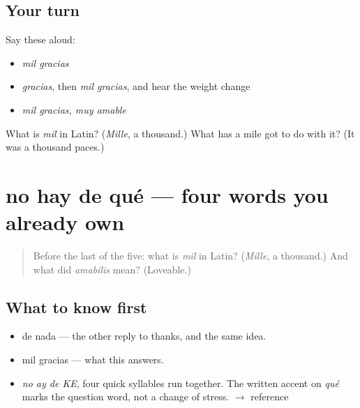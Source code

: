 \subsection*{Your turn}
Say these aloud:

\begin{itemize}
\raggedright
  \item \emph{mil gracias}
  \item \emph{gracias}, then \emph{mil gracias}, and hear the weight change
  \item \emph{mil gracias, muy amable}
\end{itemize}

\begin{tcolorbox}[breakable,colback=teal!4,colframe=teal!35!black,title={Before you move on}]
What is \emph{mil} in Latin? (\emph{Mille}, a thousand.) What has a mile got to do with it? (It was a thousand paces.)
\end{tcolorbox}
\section[no hay de qué]{no hay de qué — four words you already own}

\label{lesson:ES-C283-no-hay-de-que}



\begin{quote}
Before the last of the five: what is \emph{mil} in Latin? (\emph{Mille}, a thousand.) And what did \emph{amabilis} mean? (Loveable.)
\end{quote}

\subsection*{What to know first}
\begin{itemize}
\raggedright
  \item de nada — the other reply to thanks, and the same idea.
  \item mil gracias — what this answers.
\end{itemize}

\begin{sounds}
\begin{itemize}
\raggedright
  \item \emph{no ay de KE}, four quick syllables run together. The written accent on \emph{qué} marks the question word, not a change of stress. $\to$ reference
\end{itemize}
\end{sounds}

